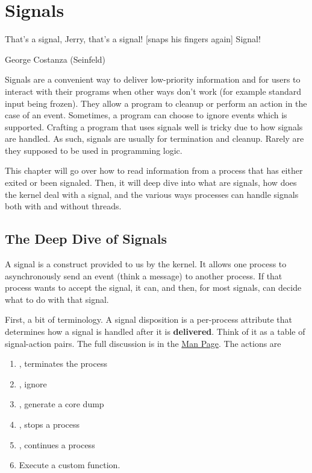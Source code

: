 \chapter{Signals}

\epigraph{That's a signal, Jerry, that's a signal! [snaps his fingers again] Signal!}{George Costanza (Seinfeld)}

Signals are a convenient way to deliver low-priority information and for users to interact with their programs when other ways don't work (for example standard input being frozen).
They allow a program to cleanup or perform an action in the case of an event.
Sometimes, a program can choose to ignore events which is supported.
Crafting a program that uses signals well is tricky due to how signals are handled.
As such, signals are usually for termination and cleanup.
Rarely are they supposed to be used in programming logic.

This chapter will go over how to read information from a process that has either exited or been signaled.
Then, it will deep dive into what are signals, how does the kernel deal with a signal, and the various ways processes can handle signals both with and without threads.

\section{The Deep Dive of Signals}

A signal is a construct provided to us by the kernel.
It allows one process to asynchronously send an event (think a message) to another process.
If that process wants to accept the signal, it can, and then, for most signals, can decide what to do with that signal.

First, a bit of terminology.
A signal disposition is a per-process attribute that determines how a signal is handled after it is \textbf{delivered}.
Think of it as a table of signal-action pairs.
The full discussion is in the \href{http://man7.org/linux/man-pages/man7/signal.7.html}{Man Page}.
The actions are
\begin{enumerate}
  \item {}, terminates the process
  \item {}, ignore
  \item {}, generate a core dump
  \item {}, stops a process
  \item {}, continues a process
  \item Execute a custom function.
\end{enumerate}

